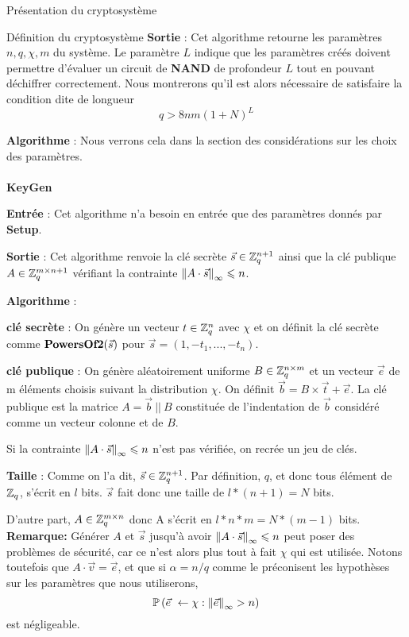 \begin{section}{Présentation du cryptosystème}
\begin{subsection}{Définition du cryptosystème}
	\textbf{Sortie} : Cet algorithme retourne les paramètres $n, q, \chi, m$ du système. Le paramètre $L$ indique que les paramètres créés doivent permettre d'évaluer un circuit de \textbf{NAND} de profondeur $L$ tout en pouvant déchiffrer correctement. Nous montrerons qu'il est alors nécessaire de satisfaire la condition dite \og de longueur \fg  
	\[q > 8nm (1 + N)^L \]

	\textbf{Algorithme} : Nous verrons cela dans la section des considérations sur les choix des paramètres.
	
	\paragraph{}
	\textbf{KeyGen}
	\flushleft
	
	\textbf{Entrée} : Cet algorithme n'a besoin en entrée que des paramètres donnés par \textbf{Setup}.

	\textbf{Sortie} : Cet algorithme renvoie la clé secrète $\vec{s} \in
	\mathbb{Z}_q^{n+1}$ ainsi que la clé publique $A \in \mathbb{Z}_q^{m \times n+1}$ vérifiant la contrainte 
	${\|A \cdot \vec{s}\|}_{\infty} \leqslant n$.

	\textbf{Algorithme} :

	\textbf{clé secrète} : On génère un vecteur $t \in \mathbb{Z}_q^n$ avec $\chi$ et on définit la clé secrète comme $\text{\textbf{PowersOf2}}(\vec{s})$ pour $\vec{s} = (1, -t_1, ..., -t_n)$.

	\textbf{clé publique} : On génère aléatoirement uniforme $B \in \mathbb{Z}_q^{n \times m}$ et un vecteur $\vec{e}$ de m
	éléments choisis suivant la distribution $\chi$. On définit $\vec{b} = B \times \vec{t} + \vec{e}$.  La clé
	publique est la matrice $A = \vec{b}\: || \:B$ constituée de l'indentation de $\vec{b}$ considéré comme un
	vecteur colonne et de $B$.

	Si la contrainte ${\|A \cdot \vec{s}\|}_{\infty} \leqslant n$ n'est pas vérifiée, on recrée un jeu de clés.

	\textbf{Taille} : Comme on l'a dit, $\vec{s} \in \mathbb{Z}_q^{n+1}$. Par définition, $q$, et donc tous élément de $\mathbb{Z}_q$, s'écrit en $l$ bits. $\vec{s}$ fait donc une taille de $l * (n+1) = N$ bits.

	D'autre part, $A \in \mathbb{Z}_q^{m \times n}$ donc A s'écrit en $l * n * m =
	N * (m - 1)$ bits. \\
	\textbf{Remarque:} Générer $A$ et $\vec{s}$ jusqu'à avoir ${\|A \cdot \vec{s}\|}_{\infty} \leqslant n$ peut poser des
	problèmes de sécurité, car ce n'est alors plus tout à fait $\chi$ qui est utilisée. 
	Notons toutefois que $A \cdot \vec{v} = \vec{e}$, et que si $\alpha = n/q$ comme le préconisent 
	les hypothèses sur les paramètres que nous utiliserons,
	\[ \PP\left(\vec{e} \leftarrow \chi: \norm{\vec{e}} > n\right) \]
	est négligeable.

\end{subsection}
\end{section}
